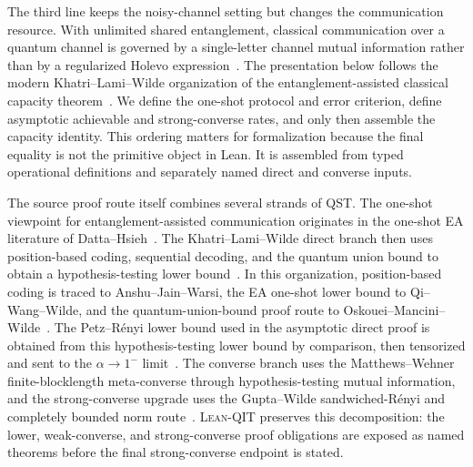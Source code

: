 \documentclass[10pt,a4paper]{article}
\DeclareRobustCommand{\LeanQIT}{\textnormal{\textsc{Lean-QIT}}}
\begin{document}
The third line keeps the noisy-channel setting but changes the communication
resource.  With unlimited shared entanglement, classical communication over a
quantum channel is governed by a single-letter channel mutual information
rather than by a regularized Holevo expression~\cite{Bennett1999,Bennett2002}.  The presentation below follows the modern
Khatri--Lami--Wilde organization of the entanglement-assisted classical capacity
theorem~\cite{KhatriLamiWilde2025Principles}. We define the one-shot protocol and error criterion, define asymptotic achievable and strong-converse rates, and
only then assemble the capacity identity.  This ordering matters for
formalization because the final equality is not the primitive object in Lean. It is assembled from typed operational definitions and separately named direct and converse inputs.

The source proof route itself combines several strands of QST.  The
one-shot viewpoint for entanglement-assisted communication originates in the
one-shot EA literature of Datta--Hsieh~\cite{DattaHsieh2011}.  The
Khatri--Lami--Wilde direct branch then
uses position-based coding, sequential decoding, and the quantum union bound
to obtain a hypothesis-testing lower bound~\cite{DattaHsieh2011,AnshuJainWarsi2019,QiWangWilde2018,OskoueiManciniWilde2019,KhatriLamiWilde2025Principles}.
In this organization, position-based coding is traced to
Anshu--Jain--Warsi, the EA one-shot lower bound to Qi--Wang--Wilde, and the
quantum-union-bound proof route to Oskouei--Mancini--Wilde~\cite{AnshuJainWarsi2019,QiWangWilde2018,OskoueiManciniWilde2019,KhatriLamiWilde2025Principles}.
The Petz--R\'enyi lower bound used in the asymptotic direct proof is obtained
from this hypothesis-testing lower bound by comparison, then tensorized and
sent to the $\alpha\to1^{-}$ limit~\cite{QiWangWilde2018,KhatriLamiWilde2025Principles}.  The converse branch uses the
Matthews--Wehner finite-blocklength meta-converse through
hypothesis-testing mutual information, and the strong-converse upgrade uses
the Gupta--Wilde sandwiched-R\'enyi and completely bounded norm route~\cite{MatthewsWehner2012,GuptaWilde2013,KhatriLamiWilde2025Principles}.
\LeanQIT{} preserves this decomposition: the lower, weak-converse, and
strong-converse proof obligations are exposed as named theorems before the
final strong-converse endpoint is stated.
	
\end{document}
